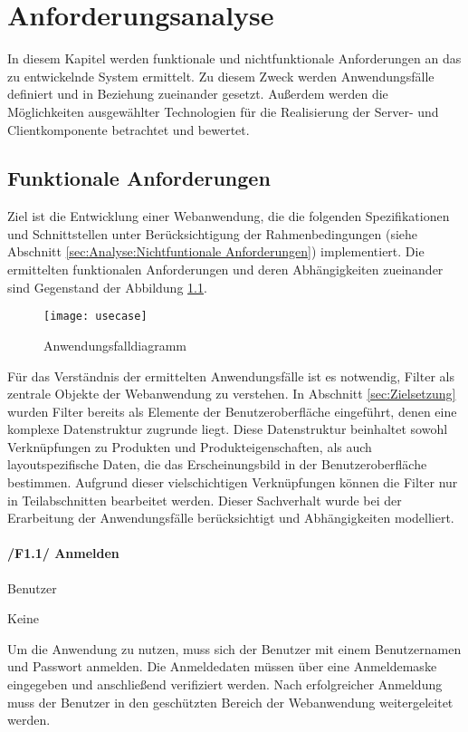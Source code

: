 \chapter{Anforderungsanalyse}
\label{cha:Anforderungsanalyse}

In diesem Kapitel werden funktionale und nichtfunktionale Anforderungen an das zu entwickelnde System ermittelt. Zu diesem Zweck werden Anwendungsfälle definiert und in Beziehung zueinander gesetzt. Außerdem werden die Möglichkeiten ausgewählter Technologien für die Realisierung der Server- und Clientkomponente betrachtet und bewertet.

\section{Funktionale Anforderungen}
\label{sec:Funktionale Anforderungen}

Ziel ist die Entwicklung einer Webanwendung, die die folgenden Spezifikationen und Schnittstellen unter Berücksichtigung der Rahmenbedingungen (siehe Abschnitt \ref{sec:Analyse:Nichtfuntionale Anforderungen}) implementiert. Die ermittelten funktionalen Anforderungen und deren Abhängigkeiten zueinander sind Gegenstand der Abbildung \ref{fig:usecase}. 

\begin{figure}[H]
\centering
\texttt{[image: usecase]} %
\caption{Anwendungsfalldiagramm}
\label{fig:usecase}
\end{figure}

Für das Verständnis der ermittelten Anwendungsfälle ist es notwendig, Filter als zentrale Objekte der Webanwendung zu verstehen. In Abschnitt \ref{sec:Zielsetzung} wurden Filter bereits als Elemente der Benutzeroberfläche eingeführt, denen eine komplexe Datenstruktur zugrunde liegt. Diese Datenstruktur beinhaltet sowohl Verknüpfungen zu Produkten und Produkteigenschaften, als auch layoutspezifische Daten, die das Erscheinungsbild in der Benutzeroberfläche bestimmen. Aufgrund dieser vielschichtigen Verknüpfungen können die Filter nur in Teilabschnitten bearbeitet werden. Dieser Sachverhalt wurde bei der Erarbeitung der Anwendungsfälle berücksichtigt und Abhängigkeiten modelliert.

\subsubsection{/F1.1/ Anmelden}

\begin{description}[leftmargin=8em,style=nextline]
\item[Akteure] Benutzer
\item[Includes] Keine
\item[Beschreibung]
Um die Anwendung zu nutzen, muss sich der Benutzer mit einem Benutzernamen und Passwort anmelden. Die Anmeldedaten müssen über eine Anmeldemaske eingegeben und anschließend verifiziert werden. Nach erfolgreicher Anmeldung muss der Benutzer in den geschützten Bereich der Webanwendung weitergeleitet werden.
\end{description}

